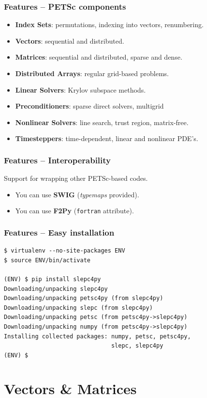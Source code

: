 \documentclass{beamer}
\begin{document}
\begin{frame}
  \frametitle{Features -- PETSc components}
  \begin{itemize}
  \item \textbf{Index Sets}: permutations, indexing into vectors, renumbering.
  \item \textbf{Vectors}: sequential and distributed.
  \item \textbf{Matrices}: sequential and distributed, sparse and dense.
  \item \textbf{Distributed Arrays}: regular grid-based problems.
  \item \textbf{Linear Solvers}: Krylov subspace methods.
  \item \textbf{Preconditioners}: sparse direct solvers, multigrid
  \item \textbf{Nonlinear Solvers}: line search, trust region, matrix-free.
  \item \textbf{Timesteppers}: time-dependent, linear and nonlinear PDE's.
  \end{itemize}
\end{frame}

\begin{frame}
  \frametitle{Features -- Interoperability}
  Support for wrapping other PETSc-based codes.
  \begin{itemize}
  \item You can use \textbf{SWIG} (\textsl{typemaps} provided).
  \item You can use \textbf{F2Py} (\texttt{fortran} attribute).
  \end{itemize}
\end{frame}

\begin{frame}[fragile]
  \frametitle{Features -- Easy installation}
\begin{verbatim}
$ virtualenv --no-site-packages ENV
$ source ENV/bin/activate

(ENV) $ pip install slepc4py
Downloading/unpacking slepc4py
Downloading/unpacking petsc4py (from slepc4py)
Downloading/unpacking slepc (from slepc4py)
Downloading/unpacking petsc (from petsc4py->slepc4py)
Downloading/unpacking numpy (from petsc4py->slepc4py)
Installing collected packages: numpy, petsc, petsc4py,
                               slepc, slepc4py
(ENV) $
\end{verbatim}
\end{frame}


\section{Vectors \& Matrices}
\end{document}

